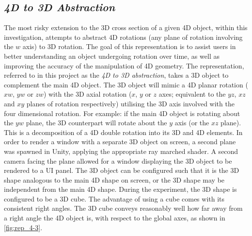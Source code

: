 \documentclass{l4proj}
\begin{document}
\subsection{\textit{4D to 3D Abstraction}}
The most risky extension to the 3D cross section of a given 4D object, within this investigation, attempts to abstract 4D rotations (any plane of rotation involving the \(w\) axis) to 3D rotation. The goal of this representation is to assist users in better understanding an object undergoing rotation over time, as well as improving the accuracy of the manipulation of 4D geometry.
The representation, referred to in this project as the \textit{4D to 3D abstraction}, takes a 3D object to complement the main 4D object. The 3D object will mimic a 4D planar rotation ($xw$, $yw$ or $zw$) with the 3D axial rotation ($x$, $y$ or $z$ axes; equivalent to the $yz$, $xz$ and $xy$ planes of rotation respectively) utilising the 3D axis involved with the four dimensional rotation. For example: if the main 4D object is rotating about the $yw$ plane, the 3D counterpart will rotate about the $y$ axis (or the $xz$ plane). This is a decomposition of a 4D double rotation into its 3D and 4D elements.
In order to render a window with a separate 3D object on screen, a second plane was spawned in Unity, applying the appropriate ray marched shader. A second camera facing the plane allowed for a window displaying the 3D object to be rendered to a UI panel.
The 3D object can be configured such that it is the 3D shape analogous to the main 4D shape on screen, or the 3D shape may be independent from the main 4D shape. During the experiment, the 3D shape is configured to be a 3D cube. 
The advantage of using a cube comes with its consistent right angles. The 3D cube conveys reasonably well how far away from a right angle the 4D object is, with respect to the global axes, as shown in \cref{fig:rep_4-3}.
\end{document}
